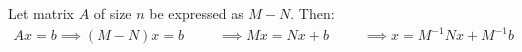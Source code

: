 $$$$
Let matrix $A$ of size $n$ be expressed as $M-N$. Then:
\begin{align*}

Ax = b \implies (M-N)x = b

\ \ \ \ \ \ \ \ \ \ \ 
\implies  Mx = Nx + b

\ \ \ \ \ \ \ \ \ \ \ 
\implies  x = M^{-1}Nx + M^{-1}b\\

\end{align*}
